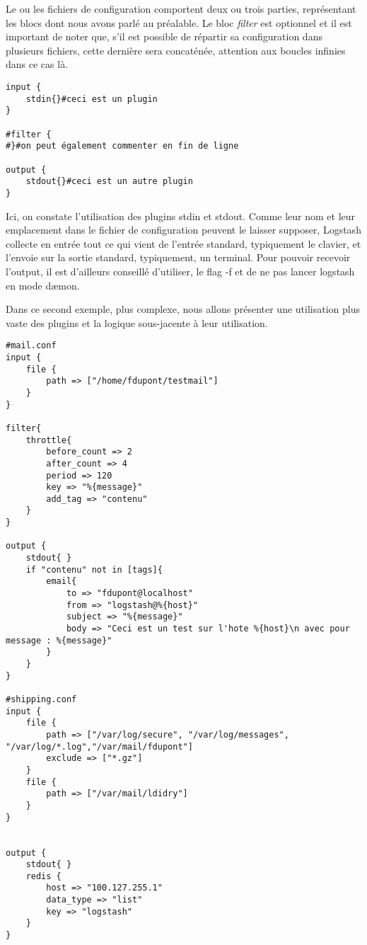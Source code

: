Le ou les fichiers de configuration comportent deux ou trois parties, représentant 
les blocs dont nous avons parlé au préalable. Le bloc \emph{filter} est optionnel
et il est important de noter que, s'il est possible de répartir sa configuration
dans plusieurs fichiers, cette dernière sera concaténée, attention aux boucles infinies
dans ce cas là.

\begin{lstlisting}[style=logstash,label={lst:conflogstashminimale},caption={Configuration minimale}]
input {
    stdin{}#ceci est un plugin
}

#filter {
#}#on peut également commenter en fin de ligne

output {
    stdout{}#ceci est un autre plugin
}
\end{lstlisting}

Ici, on constate l'utilisation des plugins stdin et stdout. Comme leur nom 
et leur emplacement dans le fichier de configuration peuvent le laisser supposer,
Logstash collecte en entrée tout ce qui vient de l'entrée standard, typiquement
le clavier, et l'envoie sur la sortie standard, typiquement, un terminal.
Pour pouvoir recevoir l'output, il est d'ailleurs conseillé d'utiliser, le flag -f
et de ne pas lancer logstash en mode dæmon.

Dans ce second exemple, plus complexe, nous allons présenter une utilisation plus
vaste des plugins et la logique sous-jacente à leur utilisation.

\begin{lstlisting}[style=logstash,label={lst:conflogstashiniteloop},caption={Infinite loop}]
#mail.conf
input {
    file {
        path => ["/home/fdupont/testmail"]
    }
}

filter{
    throttle{
        before_count => 2
        after_count => 4
        period => 120
        key => "%{message}"
        add_tag => "contenu"
    }
}

output {
    stdout{ }
    if "contenu" not in [tags]{
        email{
            to => "fdupont@localhost"
            from => "logstash@%{host}"
            subject => "%{message}"
            body => "Ceci est un test sur l'hote %{host}\n avec pour message : %{message}"
        }
    }
}

#shipping.conf
input {
    file {
        path => ["/var/log/secure", "/var/log/messages", "/var/log/*.log","/var/mail/fdupont"]
        exclude => ["*.gz"]
    }
    file {
        path => ["/var/mail/ldidry"]
    }
}


output {
    stdout{ }
    redis {
        host => "100.127.255.1"
        data_type => "list"
        key => "logstash"
    }
}
\end{lstlisting}

